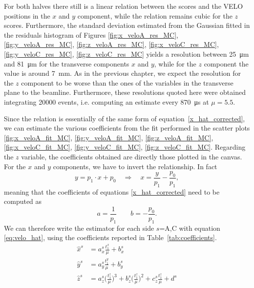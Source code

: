 For both halves there still is a linear relation between the scores and the VELO positions in the $x$ and $y$ component, while the relation remains cubic for the $z$ scores.  Furthermore, the standard deviation estimated from the Gaussian fitted in the residuals histogram of Figures \ref{fig:x_veloA_res_MC}, \ref{fig:y_veloA_res_MC}, \ref{fig:z_veloA_res_MC}, \ref{fig:x_veloC_res_MC}, \ref{fig:y_veloC_res_MC}, \ref{fig:z_veloC_res_MC} yields a resolution between \SI{25}{\micro\meter} and \SI{81}{\micro\meter} for the transverse components $x$ and $y$, while for the $z$ component the value is around \SI{7}{\milli\meter}. As in the previous chapter, we expect the resolution for the $z$ component to be worse than the ones of the variables in the transverse plane to the beamline. Furthermore, these resolutions quoted here were obtained integrating 20000 events, i.e. computing an estimate every \SI{870}{\micro\second} at $\mu=5.5$.

Since the relation is essentially of the same form of equation~\eqref{x_hat_corrected}, we can estimate the various coefficients from the fit performed in the scatter plots \ref{fig:x_veloA_fit_MC}, \ref{fig:y_veloA_fit_MC}, \ref{fig:z_veloA_fit_MC}, \ref{fig:x_veloC_fit_MC}, \ref{fig:y_veloC_fit_MC}, \ref{fig:z_veloC_fit_MC}. Regarding the $z$ variable, the coefficients obtained are directly those plotted in the canvas. For the $x$ and $y$ components, we have to invert the relationship. In fact
\begin{equation}
    y = p_1\cdot x +p_0 \quad  \Longrightarrow \quad  x = \frac{y}{p_1}-\frac{p_0}{p_1},
\end{equation}
meaning that the coefficients of equations \eqref{x_hat_corrected} need to be computed as 
\begin{equation}
    a = \frac{1}{p_1} \qquad b = -\frac{p_0}{p_1}.
\end{equation}
We can therefore write the estimator for each side $s$=A,C with equation \eqref{eq:velo_hat}, using the coefficients reported in Table~\ref{tab:coefficients}.
\begin{equation}
\begin{split}
    \hat{x}^{s} &= a_x^s \frac{t^x_1}{\mu} + b_x^s\\%
    \hat{y}^{s} &=a_y^s \frac{t^y_1}{\mu} + b_y^s \\%
    \hat{z}^{s} &=a_z^s\biggl(\frac{t^z_1}{\mu}\biggr)^3 + b_z^s\biggl(\frac{t^z_1}{\mu}\biggr)^2 + c_z^s \frac{t^z_1}{\mu} + d^s
    \end{split} \label{eq:velo_hat}
    \end{equation}
    
